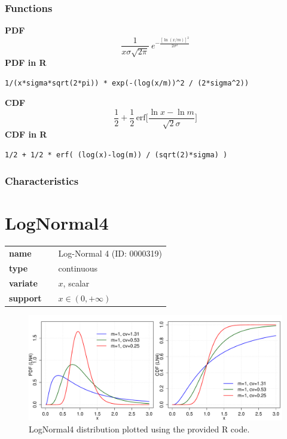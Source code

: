 \subsubsection*{Functions}

\smallskip \noindent \hspace{.2cm} \textbf{PDF} 
\begin{equation*}\frac{1}{x\sigma\sqrt{2\pi}}\ e^{-\frac{\left[\ln (x/m)\right]^2}{2\sigma^2}}\end{equation*}
\smallskip \noindent \hspace{.2cm} \textbf{PDF in R}  
\begin{verbatim}1/(x*sigma*sqrt(2*pi)) * exp(-(log(x/m))^2 / (2*sigma^2))\end{verbatim}
\smallskip \noindent \hspace{.2cm} \textbf{CDF} 
\begin{equation*}\frac12 + \frac12\,\text{erf}\Big[\frac{\ln x-\ln m}{\sqrt{2}\sigma}\Big]\end{equation*}
\smallskip \noindent \hspace{.2cm} \textbf{CDF in R} 
\begin{verbatim}1/2 + 1/2 * erf( (log(x)-log(m)) / (sqrt(2)*sigma) )\end{verbatim}
\smallskip
\subsubsection*{Characteristics}
\smallskip
\section*{LogNormal4} 

  \bigskip 

\begin{tabular}{p{2cm}cl}
\textbf{name} & & Log-Normal 4 (ID: 0000319)\\ 
 
\textbf{type} & & continuous \\ 

\textbf{variate} & & $x$, scalar \\ 

\textbf{support} & & $x \in (0,+\infty)$
\end{tabular}

\begin{figure}[ht!]
\centering
  \includegraphics[width=140mm]{pics/LogNormal4.pdf}
 \caption{LogNormal4 distribution plotted using the provided R code.}
 \label{fig:LogNormal4}
\end{figure}

